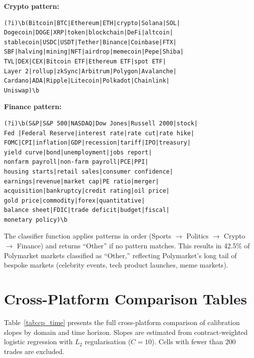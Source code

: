 \documentclass[11pt,a4paper]{article}
\begin{document}
\noindent\textbf{Crypto pattern:}
\begin{lstlisting}
(?i)\b(Bitcoin|BTC|Ethereum|ETH|crypto|Solana|SOL|
Dogecoin|DOGE|XRP|token|blockchain|DeFi|altcoin|
stablecoin|USDC|USDT|Tether|Binance|Coinbase|FTX|
SBF|halving|mining|NFT|airdrop|memecoin|Pepe|Shiba|
TVL|DEX|CEX|Bitcoin ETF|Ethereum ETF|spot ETF|
Layer 2|rollup|zkSync|Arbitrum|Polygon|Avalanche|
Cardano|ADA|Ripple|Litecoin|Polkadot|Chainlink|
Uniswap)\b
\end{lstlisting}

\noindent\textbf{Finance pattern:}
\begin{lstlisting}
(?i)\b(S&P|S&P 500|NASDAQ|Dow Jones|Russell 2000|stock|
Fed |Federal Reserve|interest rate|rate cut|rate hike|
FOMC|CPI|inflation|GDP|recession|tariff|IPO|treasury|
yield curve|bond|unemployment|jobs report|
nonfarm payroll|non-farm payroll|PCE|PPI|
housing starts|retail sales|consumer confidence|
earnings|revenue|market cap|PE ratio|merger|
acquisition|bankruptcy|credit rating|oil price|
gold price|commodity|forex|quantitative|
balance sheet|FDIC|trade deficit|budget|fiscal|
monetary policy)\b
\end{lstlisting}

\noindent The classifier function applies patterns in order (Sports $\to$ Politics $\to$ Crypto $\to$ Finance) and returns ``Other'' if no pattern matches. This results in 42.5\% of Polymarket markets classified as ``Other,'' reflecting Polymarket's long tail of bespoke markets (celebrity events, tech product launches, meme markets).

\section{Cross-Platform Comparison Tables}\label{sec:cross_platform}

Table~\ref{tab:cp_time} presents the full cross-platform comparison of calibration slopes by domain and time horizon. Slopes are estimated from contract-weighted logistic regression with $L_2$ regularisation ($C = 10$). Cells with fewer than 200 trades are excluded.
\end{document}
